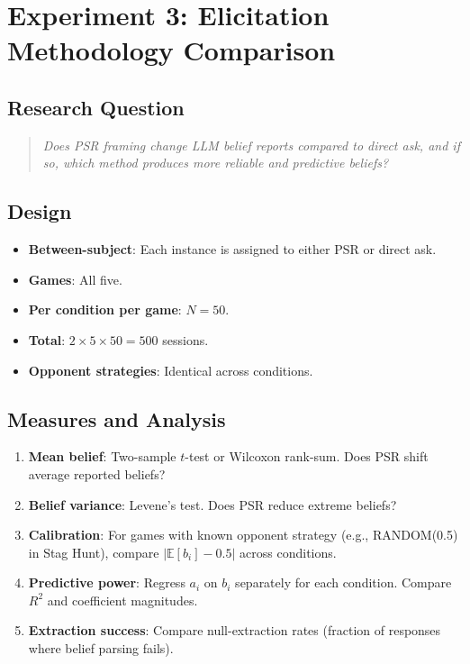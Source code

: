 \documentclass[12pt]{article}
\newcommand{\E}{\mathbb{E}}
\begin{document}
\section{Experiment 3: Elicitation Methodology Comparison}
\label{sec:exp3}

\subsection{Research Question}

\begin{quote}
\emph{Does PSR framing change LLM belief reports compared to direct ask, and if so, which method produces more reliable and predictive beliefs?}
\end{quote}

\subsection{Design}

\begin{itemize}[nosep]
    \item \textbf{Between-subject}: Each instance is assigned to either PSR or direct ask.
    \item \textbf{Games}: All five.
    \item \textbf{Per condition per game}: $N = 50$.
    \item \textbf{Total}: $2 \times 5 \times 50 = 500$ sessions.
    \item \textbf{Opponent strategies}: Identical across conditions.
\end{itemize}

\subsection{Measures and Analysis}

\begin{enumerate}[nosep]
    \item \textbf{Mean belief}: Two-sample $t$-test or Wilcoxon rank-sum. Does PSR shift average reported beliefs?
    \item \textbf{Belief variance}: Levene's test. Does PSR reduce extreme beliefs?
    \item \textbf{Calibration}: For games with known opponent strategy (e.g., RANDOM(0.5) in Stag Hunt), compare $|\E[b_i] - 0.5|$ across conditions.
    \item \textbf{Predictive power}: Regress $a_i$ on $b_i$ separately for each condition. Compare $R^2$ and coefficient magnitudes.
    \item \textbf{Extraction success}: Compare null-extraction rates (fraction of responses where belief parsing fails).
\end{enumerate}
\end{document}
